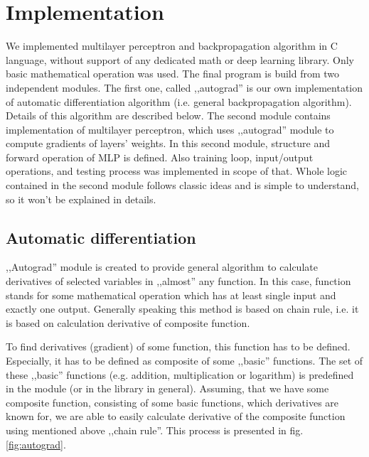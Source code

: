 \documentclass{classrep}
\begin{document}
    \section{Implementation} \label{implementation} {
        We implemented multilayer perceptron and backpropagation algorithm in C language, without
        support of any dedicated math or deep learning library. Only basic mathematical operation
        was used. The final program is build from two independent modules. The first one, called
        ,,autograd'' is our own implementation of automatic differentiation algorithm (i.e.
        general backpropagation algorithm). Details of this algorithm are described below. The
        second module contains implementation of multilayer perceptron, which uses ,,autograd''
        module to compute gradients of layers' weights. In this second module, structure and forward
        operation of MLP is defined. Also training loop, input/output operations, and testing
        process was implemented in scope of that. Whole logic contained in the second module follows
        classic ideas and is simple to understand, so it won't be explained in details.

        \subsection{Automatic differentiation} {
            ,,Autograd'' module is created to provide general algorithm to calculate derivatives of
            selected variables in ,,almost'' any function. In this case, function stands for some
            mathematical operation which has at least single input and exactly one output. Generally
            speaking this method is based on chain rule, i.e. it is based on calculation derivative
            of composite function.

            To find derivatives (gradient) of some function, this function has to be defined.
            Especially, it has to be defined as composite of some ,,basic'' functions. The set of
            these ,,basic'' functions (e.g. addition, multiplication or logarithm) is predefined
            in the module (or in the library in general). Assuming, that we have some composite
            function, consisting of some basic functions, which derivatives are known for, we are
            able to easily calculate derivative of the composite function using mentioned above
            ,,chain rule''. This process is presented in fig. \ref{fig:autograd}.

}}
\end{document}
